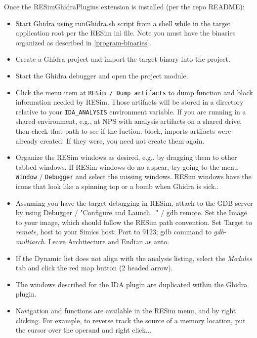 \documentclass[titlepage]{article}
\begin{document}
Once the RESimGhidraPlugins extension is installed (per the repo README): 
\begin{itemize}
\item Start Ghidra using runGhidra.sh script from a shell while in the target application root 
per the RESim ini file.  Note you must have the binaries organized as described in \ref{program-binaries}.

\item Create a Ghidra project and import the target binary into the project.

\item Start the Ghidra debugger and open the project module.

\item Click the menu item at {\tt RESim / Dump artifacts}  to dump function and block information
needed by RESim.  Those artifacts will be stored in a directory relative to your {\tt IDA\_ANALYSIS} environment variable.
If you are running in a shared environment, e.g., at NPS with analysis artifacts on a shared drive, then 
check that path to see if the fuction, block, imports artifacts were already created.  If they were, you need not create them again.

\item Organize the RESim windows
as desired, e.g., by dragging them to other tabbed windows.  If RESim windows do no appear, try going to the menu
{\tt Window} / {\tt Debugger} and select the missing windows.  RESim windows have the icons that look like a spinning top or a bomb when Ghidra is sick..

\item Assuming you have the target debugging in RESim, attach to the GDB server by using Debugger / "Configure and Launch..." / gdb remote.  
Set the Image to your image, which should follow the RESim path convention.   Set Target to \textit{remote}, host to your Simics host; Port to 9123;
gdb command to \textit{gdb-multiarch}.  Leave Architecture and Endian as auto.

\item If the Dynamic list does not align with the analysis listing, select the \textit{Modules} tab and click the red map button (2 headed arrow).

\item The windows described for the IDA plugin are duplicated within the Ghidra plugin.

\item Navigation and functions are available in the RESim menu, and by right clicking.  For example, to reverse track
the source of a memory location, put the cursor over the operand and right click...


\end{itemize}
\end{document}
